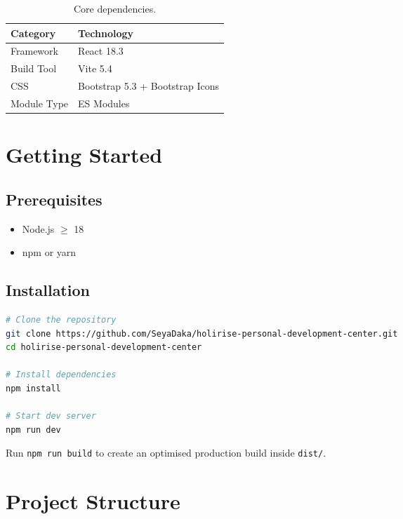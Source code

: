 \documentclass[11pt,a4paper]{article}
\begin{document}
\begin{table}[h]
\centering
\begin{tabular}{@{}ll@{}}
\toprule
\textbf{Category} & \textbf{Technology} \\
\midrule
Framework   & React 18.3 \\
Build Tool  & Vite 5.4 \\
CSS         & Bootstrap 5.3 + Bootstrap Icons \\
Module Type & ES Modules \\
\bottomrule
\end{tabular}
\caption{Core dependencies.}
\end{table}

\section{Getting Started}

\subsection{Prerequisites}

\begin{itemize}[leftmargin=*, label=\textcolor{accent}{$\bullet$}]
    \item Node.js $\geq$ 18
    \item npm or yarn
\end{itemize}

\subsection{Installation}

\begin{codebox}[Terminal]
\begin{lstlisting}[language=bash]
# Clone the repository
git clone https://github.com/SeyaDaka/holirise-personal-development-center.git
cd holirise-personal-development-center

# Install dependencies
npm install

# Start dev server
npm run dev
\end{lstlisting}
\end{codebox}

\begin{tipbox}
Run \texttt{npm run build} to create an optimised production build
inside \texttt{dist/}.
\end{tipbox}

\section{Project Structure}
\end{document}
